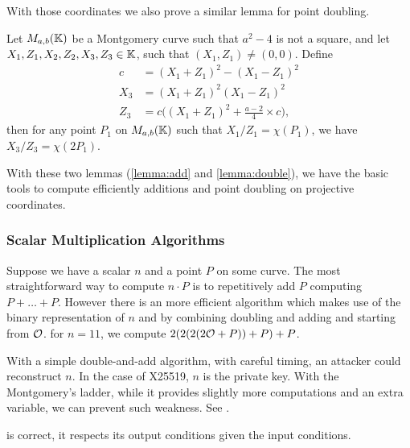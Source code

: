 With those coordinates we also prove a similar lemma for point doubling.
\begin{lemma}
\label{lemma:double}
Let $M_{a,b}(\mathbb{K})$ be a Montgomery curve such that $a^2-4$ is not a square, and
let $X_1, Z_1, X_2, Z_2, X_3, Z_3 \in \mathbb{K}$, such that $(X_1,Z_1) \neq (0,0)$. Define
\begin{align*}
  c &= (X_1 + Z_1)^2 - (X_1 - Z_1)^2\\
X_3 &= (X_1 + Z_1)^2(X_1-Z_1)^2\\
Z_3 &= c\Big((X_1 + Z_1)^2+\frac{a-2}{4}\times c\Big),
\end{align*}
then for any point $P_1$ on $M_{a,b}(\mathbb{K})$ such that $X_1/Z_1 = \chi(P_1)$,
we have $X_3/Z_3 = \chi(2P_1)$.
\end{lemma}

With these two lemmas (\ref{lemma:add} and \ref{lemma:double}), we have the basic
tools to compute efficiently additions and point doubling on projective coordinates.

\subsubsection{Scalar Multiplication Algorithms}
\label{subsec:ECC-ladder}

Suppose we have a scalar $n$ and a point $P$ on some curve. The most straightforward
way to compute $n \cdot P$ is to repetitively add $P$ \ie computing $P + \ldots + P$.
However there is an more efficient algorithm which makes use of the binary
representation of $n$ and by combining doubling and adding and starting from $\mathcal{O}$.
\eg for $n=11$, we compute $2(2(2(2\mathcal{O} + P)) + P)+ P$.

With a simple double-and-add algorithm, with careful timing, an attacker could reconstruct $n$.
In the case of X25519, $n$ is the private key. With the Montgomery's ladder, while
it provides slightly more computations and an extra variable, we can prevent such weakness.
See .

\begin{lemma}
\label{lemma:montgomery-ladder}
 is correct, \ie it respects its output conditions given the input conditions.
\end{lemma}

